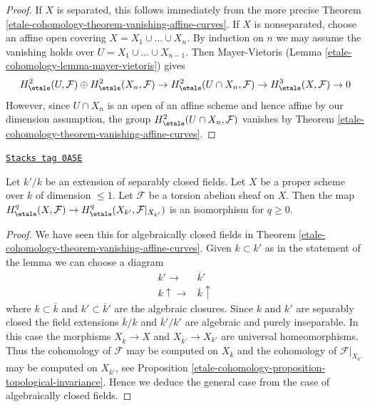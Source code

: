 \begin{proof}
If $X$ is separated, this follows immediately from the more precise
Theorem \ref{etale-cohomology-theorem-vanishing-affine-curves}.
If $X$ is nonseparated, choose an affine open covering
$X = X_1 \cup \ldots \cup X_n$. By induction on $n$ we may assume
the vanishing holds over $U = X_1 \cup \ldots \cup X_{n - 1}$.
Then Mayer-Vietoris (Lemma \ref{etale-cohomology-lemma-mayer-vietoris}) gives
$$
H^2_\etale(U, \mathcal{F}) \oplus H^2_\etale(X_n, \mathcal{F}) \to
H^2_\etale(U \cap X_n, \mathcal{F}) \to
H^3_\etale(X, \mathcal{F}) \to 0
$$
However, since $U \cap X_n$ is an open of an affine scheme
and hence affine by our dimension assumption, the group
$H^2_\etale(U \cap X_n, \mathcal{F})$ vanishes
by Theorem \ref{etale-cohomology-theorem-vanishing-affine-curves}.
\end{proof}

\begin{lemma}
\label{etale-cohomology-lemma-base-change-dim-1-separably-closed}
\href{https://stacks.math.columbia.edu/tag/0A5E}{\texttt{Stacks tag 0A5E}}

Let $k'/k$ be an extension of separably closed fields.
Let $X$ be a proper scheme over $k$ of dimension $\leq 1$.
Let $\mathcal{F}$ be a torsion abelian sheaf on $X$.
Then the map $H^q_\etale(X, \mathcal{F}) \to
H^q_\etale(X_{k'}, \mathcal{F}|_{X_{k'}})$ is an isomorphism
for $q \geq 0$.
\end{lemma}

\begin{proof}
We have seen this for algebraically closed fields in
Theorem \ref{etale-cohomology-theorem-vanishing-affine-curves}.
Given $k \subset k'$ as in the statement of the lemma we can
choose a diagram
$$
\begin{array}{cc}k' \longrightarrow & \overline{k}' \\ k \uparrow\longrightarrow & \overline{k} \uparrow\end{array}
$$
where $k \subset \overline{k}$ and $k' \subset \overline{k}'$ are
the algebraic closures. Since $k$ and $k'$ are separably closed
the field extensions
$\overline{k}/k$ and $\overline{k}'/k'$
are algebraic and purely inseparable. In this case the morphisms
$X_{\overline{k}} \to X$ and $X_{\overline{k}'} \to X_{k'}$
are universal homeomorphisms. Thus the cohomology of $\mathcal{F}$
may be computed on $X_{\overline{k}}$ and the cohomology
of $\mathcal{F}|_{X_{k'}}$ may be computed on $X_{\overline{k}'}$,
see Proposition \ref{etale-cohomology-proposition-topological-invariance}.
Hence we deduce the general case from the case of algebraically
closed fields.
\end{proof}

